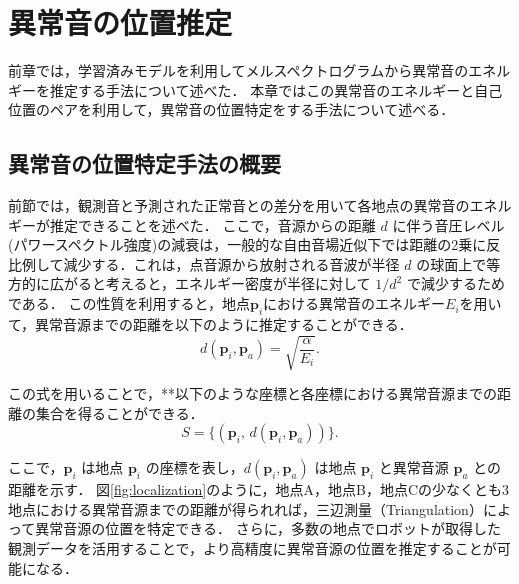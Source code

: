 \documentclass[../main]{subfiles}
\begin{document}
\section{異常音の位置推定}
\label{sec:pmethod_abnormal_detection}
前章では，学習済みモデルを利用してメルスペクトログラムから異常音のエネルギーを推定する手法について述べた．
本章ではこの異常音のエネルギーと自己位置のペアを利用して，異常音の位置特定をする手法について述べる．

\subsection{異常音の位置特定手法の概要}
前節では，観測音と予測された正常音との差分を用いて各地点の異常音のエネルギーが推定できることを述べた．
ここで，音源からの距離 $d$ に伴う音圧レベル(パワースペクトル強度)の減衰は，一般的な自由音場近似下では距離の2乗に反比例して減少する．これは，点音源から放射される音波が半径 $d$ の球面上で等方的に広がると考えると，エネルギー密度が半径に対して $1/d^2$ で減少するためである．
この性質を利用すると，地点$\mathbf{p}_i$における異常音のエネルギー$E_i$を用いて，異常音源までの距離を以下のように推定することができる．
\begin{equation}
    d(\mathbf{p}_i, \mathbf{p}_a) = \sqrt{\frac{\alpha}{E_i}}.
    \label{eq:distance}
\end{equation}

この式を用いることで，**以下のような座標と各座標における異常音源までの距離の集合を得ることができる．
\begin{equation}
    S = \{ (\mathbf{p}_i, \, d(\mathbf{p}_i,\mathbf{p}_a)) \}.
\end{equation}

ここで，$\mathbf{p}_i$ は地点 $\mathbf{p}_i$ の座標を表し，$d(\mathbf{p}_i,\mathbf{p}_a)$ は地点 $\mathbf{p}_i$ と異常音源 $\mathbf{p}_a$ との距離を示す．
図\ref{fig:localization}のように，地点A，地点B，地点Cの少なくとも3地点における異常音源までの距離が得られれば，三辺測量（Triangulation）によって異常音源の位置を特定できる．
さらに，多数の地点でロボットが取得した観測データを活用することで，より高精度に異常音源の位置を推定することが可能になる．
\end{document}
